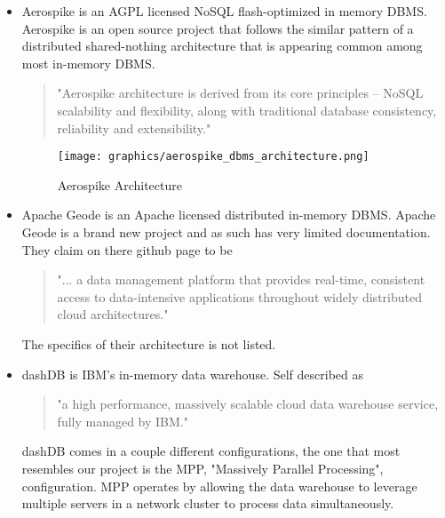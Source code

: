 \documentclass[letterpaper, 12pt]{article}
\begin{document}
\begin{itemize}
  \par\vspace{\baselineskip}
  \item Aerospike is an AGPL licensed NoSQL flash-optimized in memory 
  DBMS. Aerospike is an open source project that follows the similar pattern of 
  a distributed shared-nothing architecture that is appearing common among most
  in-memory DBMS. 
  \begin{quote}
  "Aerospike architecture is derived from its core principles – NoSQL scalability and
  flexibility, along with traditional database consistency, reliability and
  extensibility."
  \cite{aerospike}
  \end{quote}
  \par\vspace{\baselineskip}
  \begin{figure}
    \centering
    \texttt{[image: graphics/aerospike\_dbms\_architecture.png]}
    \caption{Aerospike Architecture}
  \end{figure}
  \cite{aerospike}
  \par\vspace{\baselineskip}	
  \item Apache Geode is an Apache licensed distributed in-memory DBMS. Apache Geode is
  a brand new project and as such has very limited documentation. They claim on there
  github page to be 
  \begin{quote}
  "... a data management platform that provides real-time, consistent access to 
  data-intensive applications throughout widely distributed cloud architectures."
  \cite{aerospike}
  \end{quote}
  The specifics of their architecture is not listed. 
  \par\vspace{\baselineskip}
  \item dashDB is IBM's in-memory data warehouse. Self described as 
  \begin{quote}
  "a high performance, massively scalable cloud data warehouse service, 
  fully managed by IBM." \cite{dashDB}
  \end{quote}
  dashDB comes in a couple different configurations, the one that most resembles 
  our project is the MPP, "Massively Parallel Processing", configuration. 
  MPP operates by allowing the data warehouse to leverage multiple servers 
  in a network cluster to process data simultaneously. 
  \par\vspace{\baselineskip}

\end{itemize}
\end{document}
